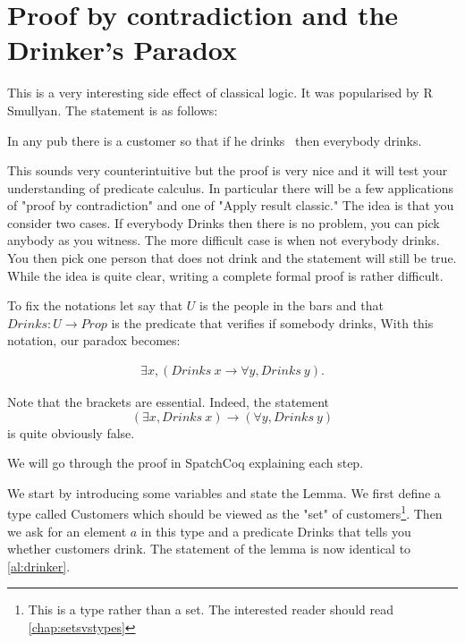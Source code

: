 \section{Proof by contradiction and the Drinker's Paradox}\label{sec:drinker}


This is a very interesting side effect of classical logic. It was popularised by R Smullyan. The statement is as follows:

In any pub there is a customer so that if he drinks \ then everybody drinks. 


This sounds very counterintuitive but the proof is very nice and it will test your understanding of predicate calculus. In particular there will be a few applications of "proof by contradiction" and one of "Apply result classic." The idea is that you consider two cases. If everybody Drinks  then there is no problem, you can pick anybody as you witness. The more difficult case is when not everybody drinks. You then pick one person that does not drink and the statement will still be true. While the idea is quite clear, writing a complete formal proof is rather difficult. 


To fix the notations let say that $U$ is the people in the bars and that $Drinks: U \rightarrow Prop$ is the  predicate that verifies if somebody drinks, With this notation, our paradox becomes:

\begin{align}\label{al:drinker}\exists x,  (Drinks \ x \rightarrow \forall y, Drinks \ y).\end{align}

Note that the brackets are essential. Indeed, the statement 
$$(\exists x,  Drinks\  x) \rightarrow (\forall y, Drinks \  y)$$
is quite obviously false.

We will go through the proof in SpatchCoq explaining each step.

We start by introducing some variables and state the Lemma. We  first define a type called Customers which should be viewed as the "set" of customers\footnote{This is a type rather than a set. The interested reader should read \ref{chap:setsvstypes}}. Then we ask for an element $a$ in this type and a predicate Drinks that tells you whether customers drink. The statement of the lemma is now identical to \ref{al:drinker}.




